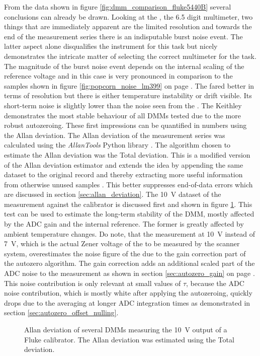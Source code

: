 From the data shown in figure \ref{fig:dmm_comparison_fluke5440B} several conclusions can already be drawn. Looking at the , the \num{6.5} digit multimeter, two things that are immediately apparent are the limited resolution and towards the end of the measurement series there is an indisputable burst noise event. The latter aspect alone disqualifies the instrument for this task but nicely demonstrates the intricate matter of selecting the correct multimeter for the task. The magnitude of the burst noise event depends on the internal scaling of the reference voltage and in this case is very pronounced in comparison to the samples shown in figure \ref{fig:popcorn_noise_lm399} on page \pageref{fig:popcorn_noise_lm399}. The  fared better in terms of resolution but there is either temperature instability or drift visible. Its short-term noise is slightly lower than the noise seen from the . The Keithley  demonstrates the most stable behaviour of all DMMs tested due to the more robust autozeroing. These first impressions can be quantified in numbers using the Allan deviation. The Allan deviation of the measurement series was calculated using the \textit{AllanTools} Python library \cite{allantools}. The algorithm chosen to estimate the Allan deviation was the Total deviation. This is a modified version of the Allan deviation estimator and extends the idea by appending the same dataset to the original record and thereby extracting more useful information from otherwise unused samples \cite{totdev,totdev_2}. This better suppresses end-of-data errors which are discussed in section \ref{sec:allan_deviation}. The \qty{10}{\V} dataset of the measurement against the calibrator is discussed first and shown in figure \ref{fig:dmm_comparison_fluke5440B_adev}. This test can be used to estimate the long-term stability of the DMM, mostly affected by the ADC gain and the internal reference. The former is greatly affected by ambient temperature changes. Do note, that the measurement at \qty{10}{\V} instead of \qty{7}{V}, which is the actual Zener voltage of the  to be measured by the scanner system, overestimates the noise figure of the  due to the gain correction part of the autozero algorithm. The gain correction adds an additional scaled part of the ADC noise to the measurement as shown in section \ref{sec:autozero_gain} on page \pageref{sec:autozero_gain}. This noise contribution is only relevant at small values of $\tau$, because the ADC noise contribution, which is mostly white after applying the autozeroing, quickly drops due to the averaging at longer ADC integration times as demonstrated in section \ref{sec:autozero_offset_nulling}.
\begin{figure}[ht]
    \centering
    \caption{Allan deviation of several DMMs measuring the \qty{10}{\V} output of a Fluke  calibrator. The Allan deviation was estimated using the Total deviation.}
    \label{fig:dmm_comparison_fluke5440B_adev}
\end{figure}

